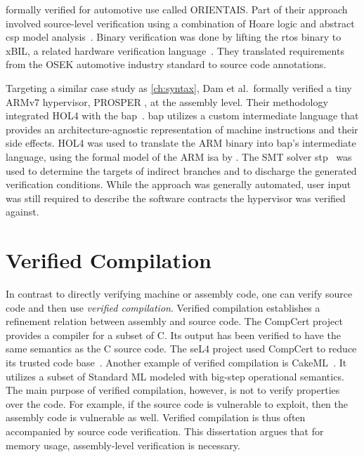 \citet{shi2012orientais} formally verified  for automotive use
called ORIENTAIS.
Part of their approach involved source-level verification
using a combination of Hoare logic
and abstract \ac{csp} model analysis~\citep{hoare1978csp}.
Binary verification was done by lifting the \ac{rtos} binary to xBIL,
a related hardware verification language~\citep{shi2012xbil}.
They translated requirements from the OSEK automotive industry standard
to source code annotations.

Targeting a similar case study as \cref{ch:syntax},
Dam et al.\ formally verified a tiny ARMv7 hypervisor,
PROSPER \citep{dam2013hypervisor,baumann2016high},
at the assembly level.
Their methodology integrated HOL4 with the \ac{bap}~\citep{brumley2011bap}.
\Ac{bap} utilizes a custom intermediate language
that provides an architecture-agnostic representation of machine instructions
and their side effects.
HOL4 was used to translate the ARM binary into \ac{bap}'s intermediate language,
using the formal model of the ARM \ac{isa} by \citet{fox2010arm}.
The SMT solver \ac{stp}~\citep{ganesh2007stp}
was used to determine the targets of indirect branches
and to discharge the generated verification conditions.
While the approach was generally automated,
user input was still required to describe the software contracts
the hypervisor was verified against.

\section{Verified Compilation}
In contrast to directly verifying machine or assembly code,
one can verify source code and then use \emph{verified compilation}.%
Verified compilation establishes a refinement relation between assembly and source code.
The CompCert project~\citep{leroy:compcert} provides a compiler for a subset of C.
Its output has been verified to have the same semantics as the C source code.
The seL4 project used CompCert to reduce its trusted code base~\citep{Klein_AEMSKH_14}.
Another example of verified compilation is CakeML~\citep{kumar2014cakeml}.
It utilizes a subset of Standard ML modeled with big-step operational semantics.
The main purpose of verified compilation, however,
is not to verify properties over the code.
For example, if the source code is vulnerable to  exploit,
then the assembly code is vulnerable as well.
Verified compilation is thus often accompanied by source code verification.
This dissertation argues that for memory usage, assembly-level verification is necessary.

